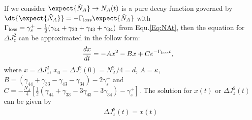 \documentclass[]{report}
\begin{document}
If we consider $ \expect{\hat{N}_A}\rightarrow N_A(t) $ is a pure decay function governed by $ \dt{\expect{\hat{N}_A}} = -\Gamma_{\rm loss}\expect{\hat{N}_A} $ with $ \Gamma_{\rm loss}= \gamma_s^+ - \frac{1}{2}(\gamma_{44}+\gamma_{33}+\gamma_{43}+\gamma_{34}) $ from Equ.\eqref{Eq:NAt}, then the equation for $ \Delta J_z^2 $ can be approximated in the follow form:
\begin{align}
	\frac{d x}{d t} = -A x^2 - B x + C e^{-\Gamma_{\rm loss}t},
\end{align}
where $ x=\Delta J_z^2 $, $ x_0=\Delta J_z^2(0)=N_A^2/4=d $, $ A = \kappa $, $ B=(\gamma_{44}+\gamma_{33}-\gamma_{43}-\gamma_{34} ) -2\gamma_s^+ $ and $ C=-\frac{N_A}{4}\left[\frac{1}{2}(\gamma_{44}+\gamma_{33}-3\gamma_{43}-3\gamma_{34} ) -\gamma_s^+\right]  $.
The solution for $ x(t) $ or $ \Delta J_z^2(t) $ can be given by
\begin{align}
&\Delta J_z^2(t) = x(t)\nonumber\\

\end{align}
\end{document}
